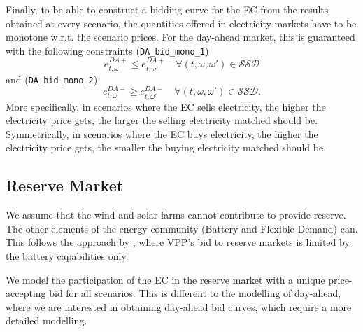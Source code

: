 \documentclass{article}
\begin{document}
Finally, to be able to construct a bidding curve for the EC from the results obtained at every scenario, the quantities offered in electricity markets have to be monotone w.r.t. the scenario prices. For the day-ahead market, this is guaranteed with the following constraints (\verb|DA_bid_mono_1|)
\begin{equation} \label{EQ:DA_bid_mono_1}
	e^{DA+}_{t, \omega} \leq e^{DA+}_{t, \omega'} \quad \forall (t, \omega, \omega') \in \mathcal{SSD}
\end{equation}
and (\verb|DA_bid_mono_2|)
\begin{equation} \label{EQ:DA_bid_mono_2}
	e^{DA-}_{t, \omega} \geq e^{DA-}_{t, \omega'} \quad \forall (t, \omega, \omega') \in \mathcal{SSD}.
\end{equation}
More specifically, in scenarios where the EC sells electricity, the higher the electricity price gets, the larger the selling electricity matched should be. Symmetrically, in scenarios where the EC buys electricity, the higher the electricity price gets, the smaller the buying electricity matched should be. 



\subsection{Reserve Market}

We assume that the wind and solar farms cannot contribute to provide reserve. The other elements of the energy community (Battery and Flexible Demand) can. This follows the approach by \textcite{Heredia18}, where VPP's bid to reserve markets is limited by the battery capabilities only.

We model the participation of the EC in the reserve market with a unique price-accepting bid for all scenarios. This is different to the modelling of day-ahead, where we are interested in obtaining day-ahead bid curves, which require a more detailed modelling.

\end{document}
